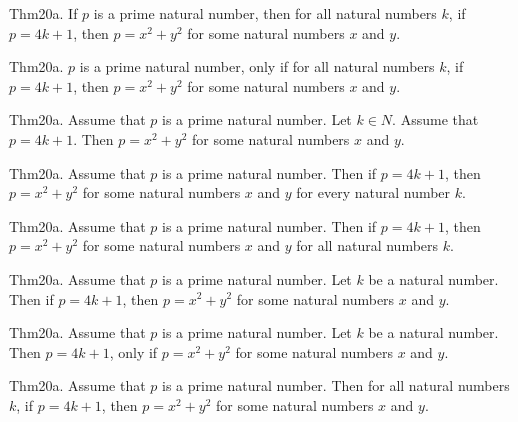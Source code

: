 \documentclass{article}
\begin{document}
Thm20a. If $p$ is a prime natural number, then for all natural numbers $k$, if $p = 4 k + 1$, then $p = x ^{ 2}+ y ^{ 2}$ for some natural numbers $x$ and $y$.

Thm20a. $p$ is a prime natural number, only if for all natural numbers $k$, if $p = 4 k + 1$, then $p = x ^{ 2}+ y ^{ 2}$ for some natural numbers $x$ and $y$.

Thm20a. Assume that $p$ is a prime natural number. Let $k \in N$. Assume that $p = 4 k + 1$. Then $p = x ^{ 2}+ y ^{ 2}$ for some natural numbers $x$ and $y$.

Thm20a. Assume that $p$ is a prime natural number. Then if $p = 4 k + 1$, then $p = x ^{ 2}+ y ^{ 2}$ for some natural numbers $x$ and $y$ for every natural number $k$.

Thm20a. Assume that $p$ is a prime natural number. Then if $p = 4 k + 1$, then $p = x ^{ 2}+ y ^{ 2}$ for some natural numbers $x$ and $y$ for all natural numbers $k$.

Thm20a. Assume that $p$ is a prime natural number. Let $k$ be a natural number. Then if $p = 4 k + 1$, then $p = x ^{ 2}+ y ^{ 2}$ for some natural numbers $x$ and $y$.

Thm20a. Assume that $p$ is a prime natural number. Let $k$ be a natural number. Then $p = 4 k + 1$, only if $p = x ^{ 2}+ y ^{ 2}$ for some natural numbers $x$ and $y$.

Thm20a. Assume that $p$ is a prime natural number. Then for all natural numbers $k$, if $p = 4 k + 1$, then $p = x ^{ 2}+ y ^{ 2}$ for some natural numbers $x$ and $y$.
\end{document}
